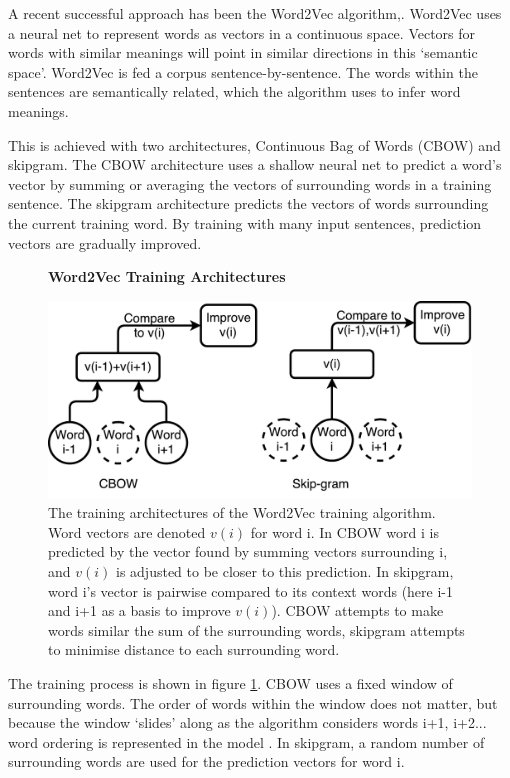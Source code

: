  A recent successful approach has been the Word2Vec algorithm\cite{word2vec1},\cite{word2vec2}.  Word2Vec uses a neural net to represent words as vectors in a continuous space. Vectors for words with similar meanings will point in similar directions in this `semantic space'. Word2Vec is fed a corpus sentence-by-sentence. The words within the sentences are semantically related, which the algorithm uses to infer word meanings. 
 
This is achieved with two architectures, Continuous Bag of Words (CBOW) and skipgram. The CBOW architecture uses a shallow neural net to predict a word's vector by summing or averaging the vectors of surrounding words in a training sentence. The skipgram architecture predicts the vectors of words surrounding the current training word. By training with many input sentences, prediction vectors are gradually improved. 

\begin{figure}[H]
    \centering
    \textbf{Word2Vec Training Architectures}\par\medskip
    \includegraphics[width=\textwidth]{Natural_Language_Processing/cbow_v_skip.pdf}
    \caption[Word2Vec Training Architectures ]{The training architectures of the Word2Vec training algorithm. Word vectors are denoted $v(i)$ for word i. In CBOW word i is predicted by the vector found by summing vectors surrounding i, and $v(i)$ is adjusted to be closer to this prediction. In skipgram, word i's vector is pairwise compared to its context words (here i-1 and i+1 as a basis to improve $v(i)$). CBOW attempts to make words similar the sum of the surrounding words, skipgram attempts to minimise distance to each surrounding word.}
     \label{fig:CBOWSKIP}
\end{figure}

The training process is shown in figure \ref{fig:CBOWSKIP}. CBOW uses a fixed window of surrounding words. The order of words within the window does not matter, but because the window `slides' along as the algorithm considers words i+1, i+2... word ordering is represented in the model . In skipgram, a random number of surrounding words are used for the prediction vectors for word i. 

